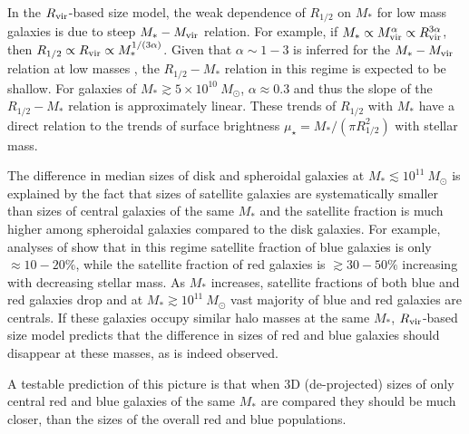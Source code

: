 \documentclass[usenatbib,usegraphicx,letterpaper]{mn2e}
\newcommand{\rhalf}{R_{1/2}}
\newcommand{\mstar}{M_{\ast}}
\newcommand{\mvir}{M_{\rm vir}}
\newcommand{\rvir}{R_{\rm vir}}
\newcommand{\rproj}{r_{\rm p}}
\newcommand{\wproj}{w_{\rm p}}
\begin{document}
In the $\rvir$-based size model, the weak dependence of $\rhalf$ on $\mstar$ for low mass galaxies is due to steep $\mstar-\mvir$ relation. For example, if $\mstar\propto\mvir^\alpha\propto\rvir^{3\alpha}$, then $\rhalf\propto \rvir\propto \mstar^{1/(3\alpha)}$. Given that $\alpha\sim 1-3$ is inferred for the $\mstar-\mvir$ relation at low masses \citep{kravtsov10,behroozi13_smhm,kravtsov_etal14}, the $\rhalf-\mstar$ relation in this regime is expected to be shallow. 
For galaxies of $\mstar\gtrsim 5\times 10^{10}\ M_\odot$, $\alpha\approx 0.3$ \citep[e.g.,][]{kravtsov_etal14} and thus 
the slope of the $\rhalf-\mstar$ relation is approximately linear. These trends of $\rhalf$ with $\mstar$ have a direct relation to the trends of surface brightness $\mu_\star=\mstar/(\pi\rhalf^2)$ with stellar mass. 

The difference in median sizes of disk and spheroidal galaxies at $\mstar\lesssim 10^{11}\ M_\odot$ is explained by the fact that sizes of satellite galaxies are systematically smaller than sizes of central galaxies of the same $\mstar$ and   
the satellite fraction is much higher among spheroidal galaxies compared to the disk galaxies. For example, analyses of \citet{rodriguez_puebla_etal15} show that in this regime satellite fraction of blue galaxies is only $\approx 10-20\%$, while
the satellite fraction of red galaxies is $\gtrsim 30-50\%$ increasing with decreasing stellar mass. 
As $\mstar$ increases, satellite fractions of both blue and red galaxies drop and at $\mstar\gtrsim 10^{11}\ M_\odot$ vast majority of blue and red galaxies are centrals. If these galaxies occupy similar halo masses at the same $\mstar$, $\rvir$-based size model predicts that  the difference in sizes of red and blue galaxies should disappear at these masses, as is indeed observed. 

A testable prediction of this picture is that when 3D (de-projected) sizes of only central red and blue galaxies of the same $\mstar$ are compared they should be much closer, than the sizes of the overall red and blue populations.



\end{document}
